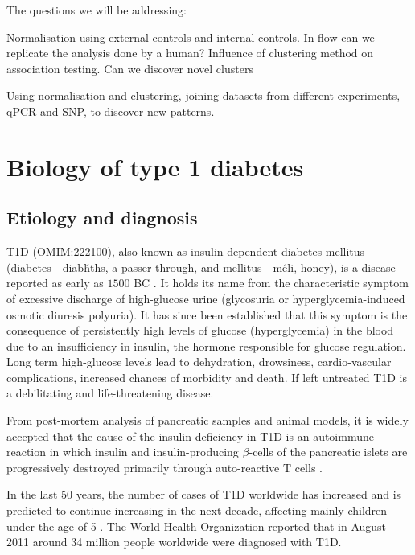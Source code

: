 The questions we will be addressing:

Normalisation using external controls and internal controls.
In flow can we replicate the analysis done by a human?
Influence of clustering method on association testing.
Can we discover novel clusters

Using normalisation and clustering, joining datasets from different experiments, qPCR and SNP, to discover new patterns.


\section{Biology of type 1 diabetes}

\subsection{Etiology and diagnosis}

\Gls{T1D} (OMIM:222100), also known as insulin dependent diabetes mellitus (diabetes - \foreignlanguage{greek}{diab\'hths},
a passer through, and mellitus - \foreignlanguage{greek}{m\'eli}, honey), is a disease reported as early as $1500$ BC \citep{Poretsky:2010wr}.
It holds its name from the characteristic symptom of excessive discharge of high-glucose urine (glycosuria or hyperglycemia-induced osmotic diuresis polyuria).
It has since been established that this symptom is the consequence of persistently high levels of glucose (hyperglycemia) in the blood due to an insufficiency in insulin,
the hormone responsible for glucose regulation.
Long term high-glucose levels lead to dehydration, drowsiness, cardio-vascular complications, increased chances of morbidity and death.  
If left untreated T1D is a debilitating and life-threatening disease.

From post-mortem analysis of pancreatic samples and animal models,
it is widely accepted that the cause of the insulin deficiency in \gls{T1D} is an autoimmune reaction
in which insulin and insulin-producing $\beta$-cells of the pancreatic islets
are progressively destroyed primarily through auto-reactive T cells \citep{Todd:2010bl}.  

In the last 50 years, the number of cases of T1D worldwide has increased and is predicted to continue increasing in the next decade,
affecting mainly children under the age of 5 \citep{Patterson:2009gj}.
The World Health Organization reported that in August 2011 around 34 million people worldwide were diagnosed with T1D.

